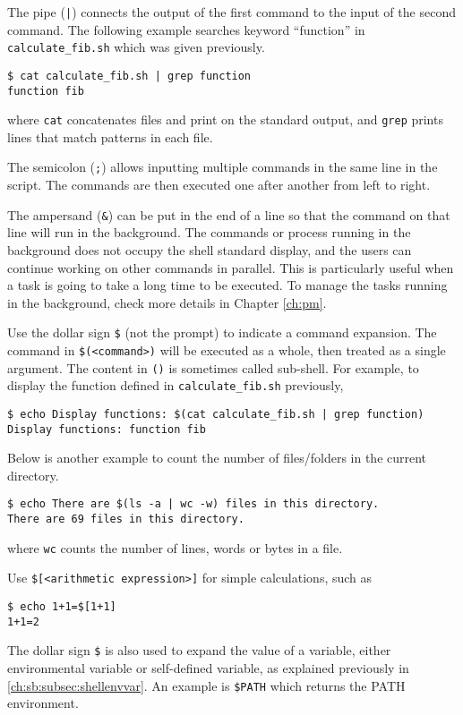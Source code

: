 The pipe (\verb$|$) connects the output of the first command to the input of the second command. The following example searches keyword ``function'' in \verb|calculate_fib.sh| which was given previously.
\begin{lstlisting}
$ cat calculate_fib.sh | grep function
function fib
\end{lstlisting}
where \verb|cat| concatenates files and print on the standard output, and \verb|grep| prints lines that match patterns in each file.

The semicolon (\verb|;|) allows inputting multiple commands in the same line in the script. The commands are then executed one after another from left to right.

The ampersand (\verb|&|) can be put in the end of a line so that the command on that line will run in the background. The commands or process running in the background does not occupy the shell standard display, and the users can continue working on other commands in parallel. This is particularly useful when a task is going to take a long time to be executed. To manage the tasks running in the background, check more details in Chapter \ref{ch:pm}.

Use the dollar sign \verb|$| (not the prompt) to indicate a command expansion. The command in \verb|$(<command>)| will be executed as a whole, then treated as a single argument. The content in \verb|()| is sometimes called sub-shell. For example, to display the function defined in \verb|calculate_fib.sh| previously,
\begin{lstlisting}
$ echo Display functions: $(cat calculate_fib.sh | grep function)
Display functions: function fib
\end{lstlisting}
Below is another example to count the number of files/folders in the current directory.
\begin{lstlisting}
$ echo There are $(ls -a | wc -w) files in this directory.
There are 69 files in this directory.
\end{lstlisting}
where \verb|wc| counts the number of lines, words or bytes in a file.

Use \verb|$[<arithmetic expression>]| for simple calculations, such as
\begin{lstlisting}
$ echo 1+1=$[1+1]
1+1=2
\end{lstlisting}

The dollar sign \verb|$| is also used to expand the value of a variable, either environmental variable or self-defined variable, as explained previously in \ref{ch:sb:subsec:shellenvvar}. An example is \verb|$PATH| which returns the PATH environment.

